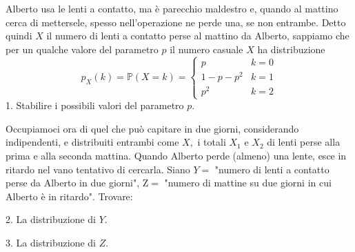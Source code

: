Alberto usa le lenti a contatto, ma è parecchio maldestro e, quando al mattino cerca di mettersele, spesso nell'operazione ne perde una, se non entrambe. Detto quindi $X$ il numero di lenti a contatto perse al mattino da Alberto, sappiamo che per un qualche valore del parametro $p$ il numero casuale $X$ ha distribuzione
\begin{equation*}
p_{X} (k)=\mathbb{P} (X=k)=\begin{cases}
p & k=0\\
1-p-p^{2} & k=1\\
p^{2} & k=2
\end{cases}
\end{equation*}
1. Stabilire i possibili valori del parametro $p$.

Occupiamoci ora di quel che può capitare in due giorni, considerando indipendenti, e distribuiti entrambi come $X,$ i totali $X_{1}$ e $X_{2}$ di lenti perse alla prima e alla seconda mattina. Quando Alberto perde (almeno) una lente, esce in ritardo nel vano tentativo di cercarla. Siano $Y=$ "numero di lenti a contatto perse da Alberto in due giorni", $\mathrm{Z} =$ "numero di mattine su due giorni in cui Alberto è in ritardo". Trovare:

2. La distribuzione di $Y$.

3. La distribuzione di $Z$.

\ParteSoluzioni

